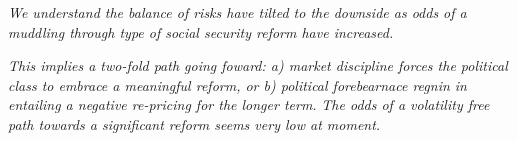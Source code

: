 \documentclass{report}
\date{}
\title{}
\begin{document}
\thispagestyle{firststyle}
\JournalIssue

    \begin{tcolorbox}[colbak=red!5!white, colframe=red!0!white]
      \begin{compactitem}
      \item \textit{We understand the balance of risks have tilted to the downside as odds of a muddling through type of social security reform have increased.}
      \item \textit{This implies a two-fold path going foward: a) market discipline forces the political class to embrace a meaningful reform,
                    or b) political forebearnace regnin in entailing a negative re-pricing for the longer term.}
      \itme \textit{The odds of a volatility free path towards a significant reform seems very low at moment.}
      \end{compactitem}
    \end{tcolorbox}
\vspace{-0.5cm}
\end{document}
